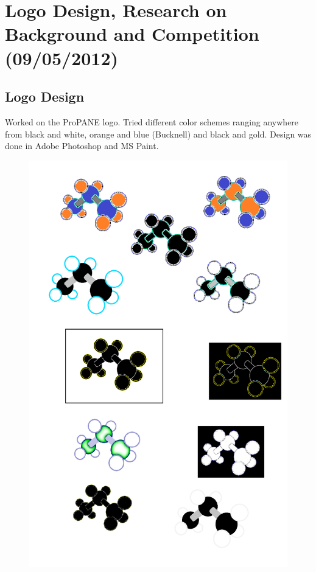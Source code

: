 \documentclass[]{article}
\begin{document}
{	%
	\section{Logo Design, Research on Background and Competition  (09/05/2012)}

		\subsection*{Logo Design}
		Worked on the ProPANE logo.  Tried different color schemes ranging anywhere from black and white, orange and blue (Bucknell) and black and gold.  Design was done in Adobe Photoshop and MS Paint.

\begin{figure}[H]
\begin{minipage}[b]{0.45\linewidth}
\centering
\includegraphics[scale=0.22]{images/logo_options}

\end{minipage}
\end{figure}}
\end{document}
